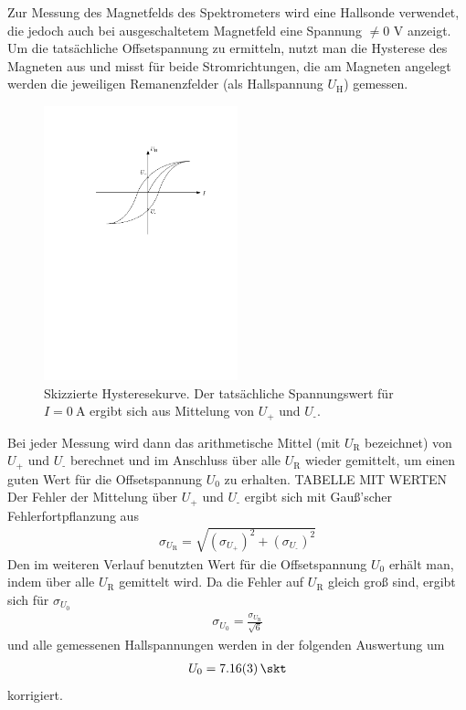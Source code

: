 \documentclass[11pt, a4paper]{article}
\numberwithin{equation}{section}
\begin{document}
Zur Messung des Magnetfelds des Spektrometers wird eine Hallsonde verwendet, die jedoch auch bei ausgeschaltetem Magnetfeld eine Spannung $\neq 0$ \si{\volt} anzeigt.
Um die tatsächliche Offsetspannung zu ermitteln, nutzt man die Hysterese des Magneten aus und misst für beide Stromrichtungen, die am Magneten angelegt werden die jeweiligen Remanenzfelder (als Hallspannung $U_\text{H}$) gemessen.
\begin{figure}[h]
	\centering
	\includegraphics[width=0.5\textwidth]{./figures/hysterese.pdf}
	\caption{Skizzierte Hysteresekurve. Der tatsächliche Spannungswert für $I=\SI{0}{\ampere}$ ergibt sich aus Mittelung von $U_\text{+}$ und $U_\text{-}$.}
	\label{fig:hysterese}
\end{figure}
Bei jeder Messung wird dann das arithmetische Mittel (mit $U_\text{R}$ bezeichnet) von $U_\text{+}$ und $U_\text{-}$ berechnet und im Anschluss über alle $U_\text{R}$ wieder gemittelt, um einen guten Wert für die Offsetspannung $U_0$ zu erhalten.
TABELLE MIT WERTEN
Der Fehler der Mittelung über $U_\text{+}$ und $U_\text{-}$ ergibt sich mit Gauß'scher Fehlerfortpflanzung aus
\begin{align}
	\sigma_{U_\text{R}} = \sqrt{(\sigma_{U_\text{+}})^2 + (\sigma_{U_\text{-}})^2}
\end{align}
Den im weiteren Verlauf benutzten Wert für die Offsetspannung $U_0$ erhält man, indem über alle $U_\text{R}$ gemittelt wird. Da die Fehler auf $U_\text{R}$ gleich groß sind, ergibt sich für $\sigma_{U_0}$
\begin{align}
	\sigma_{U_0} = \frac{\sigma_{U_\text{R}}}{\sqrt{6}}
\end{align}
und alle gemessenen Hallspannungen werden in der folgenden Auswertung um
\begin{align}
	U_0 = \SI{7.16 +- 0.03}{\skt}
\end{align}
korrigiert.
\end{document}
